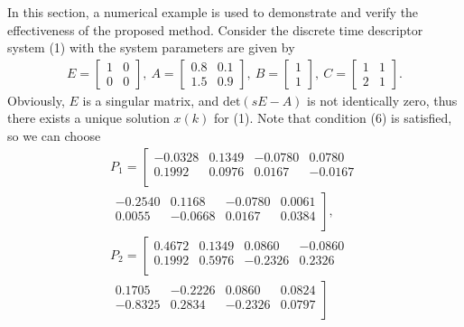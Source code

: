 \documentclass[english]{cccconf}
\theoremstyle{definition}
\begin{document}
In this section, a numerical example is used to demonstrate and verify the effectiveness of the proposed method. Consider the discrete time descriptor system (1) with the system parameters are given by 
\begin{align*}
E=\begin{bmatrix}
1&0\\0&0
\end{bmatrix},\ 
A=\begin{bmatrix}
0.8&0.1\\1.5&0.9
\end{bmatrix},\ 
B=\begin{bmatrix}
1\\1
\end{bmatrix},\ 
C=\begin{bmatrix}
1&1\\2&1
\end{bmatrix}.
\end{align*}
Obviously, $E$ is a singular matrix, and $\mathrm{det}(sE-A)$ is not identically zero, thus there exists a unique solution $x(k)$ for (1). Note that condition (6) is satisfied, so we can choose
\begin{equation}
\begin{split}
P_1=\left[\begin{array}{cccc}
-0.0328   & 0.1349  & -0.0780&0.0780\\0.1992  &  0.0976 &   0.0167&-0.0167\\ \end{array}\right.\\
\left.\begin{array}{cccc}   -0.2540&   0.1168&  -0.0780  &  0.0061\\0.0055&  -0.0668 & 0.0167  &  0.0384\\ \end{array}\right],\nonumber \\
P_2=\left[\begin{array}{cccc}
0.4672 & 0.1349 & 0.0860 & -0.0860\\0.1992  & 0.5976 & -0.2326  & 0.2326\\ \end{array}\right.\\
\left.\begin{array}{cccc}  0.1705  & -0.2226&  0.0860  &  0.0824\\-0.8325  &  0.2834 &-0.2326    &0.0797\\ \end{array}\right]\nonumber
\end{split}
\end{equation}
\end{document}
